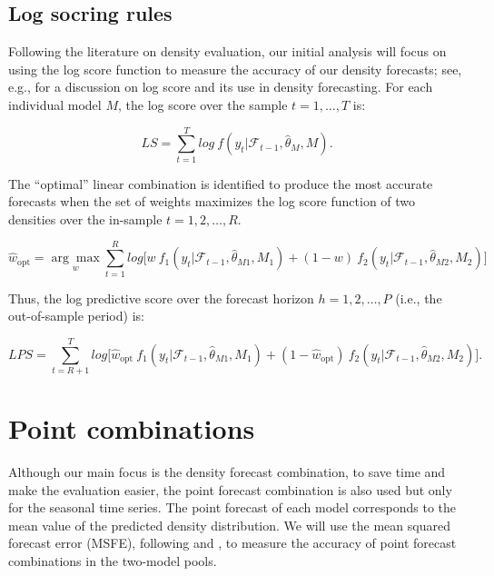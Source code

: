 \documentclass{monashthesis}
\begin{document}
\hypertarget{log-socring-rules}{%
\subsection{Log socring rules}\label{log-socring-rules}}

Following the literature on density evaluation, our initial analysis will focus on using the log score function to measure the accuracy of our density forecasts; see, e.g., \textcite{GA11} for a discussion on log score and its use in density forecasting. For each individual model \(M\), the log score over the sample \(t = 1, \dots, T\) is:

\begin{equation}
\label{eqn:LS1}
LS = \sum^T_{t=1} log \ f(y_t| \mathcal{F}_{t-1}, \hat\theta_M, M).
\end{equation}

The ``optimal'' linear combination is identified to produce the most accurate forecasts when the set of weights maximizes the log score function of two densities over the in-sample \(t = 1, 2, \dots, R\).

\begin{equation}
\label{eqn:LS2}
\hat{w}_{\text{opt}} = \underset{w}{\arg\max} \sum^R_{t=1} log \Big[ w \ f_1(y_t| \mathcal{F}_{t-1}, \hat\theta_{M1}, M_1) + (1-w) \ f_2(y_t| \mathcal{F}_{t-1}, \hat\theta_{M2}, M_2)\Big]
\end{equation}

Thus, the log predictive score over the forecast horizon \(h = 1, 2, \dots, P\) (i.e., the out-of-sample period) is:

\begin{equation}
\label{eqn:LS3}
LPS = \sum^T_{t = R+1} log \Big[ \hat{w}_{\text{opt}} \ f_1(y_t| \mathcal{F}_{t-1}, \hat\theta_{M1}, M_1) + (1- \hat{w}_{\text{opt}}) \ f_2(y_t| \mathcal{F}_{t-1}, \hat\theta_{M2}, M_2)\Big].
\end{equation}

\hypertarget{point-combinations}{%
\section{Point combinations}\label{point-combinations}}

Although our main focus is the density forecast combination, to save time and make the evaluation easier, the point forecast combination is also used but only for the seasonal time series. The point forecast of each model corresponds to the mean value of the predicted density distribution. We will use the mean squared forecast error (MSFE), following \textcite{BG69} and \textcite{SW09}, to measure the accuracy of point forecast combinations in the two-model pools.
\end{document}
